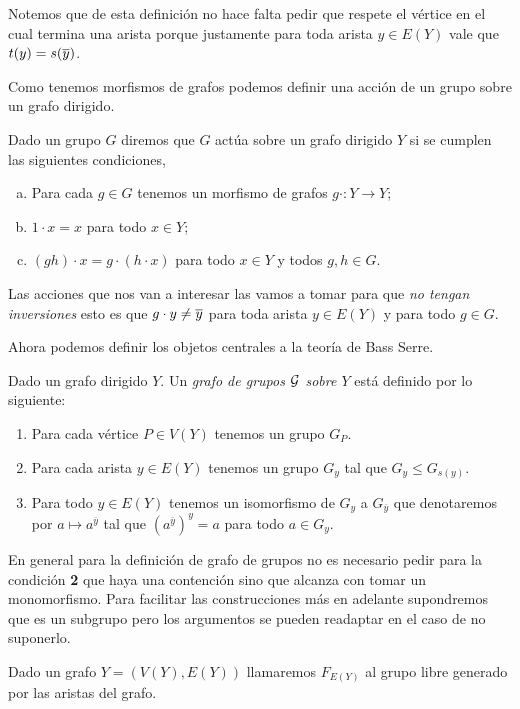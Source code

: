 \documentclass[tesis.tex]{subfiles}
\begin{document}
Notemos que de esta definición no hace falta pedir que respete el vértice en el cual termina una arista porque justamente para toda arista $y \in E(Y)$ vale que $t(y) = s(\overline y)$.

Como tenemos morfismos de grafos podemos definir una acción de un grupo sobre un grafo dirigido.

\begin{deff}
	Dado un grupo $G$ diremos que $G$ actúa sobre un grafo dirigido $Y$ si se cumplen las siguientes condiciones,
	\begin{enumerate}[a.]
		\item Para cada $g \in G$ tenemos un morfismo de grafos $g \cdot : Y \to Y$;
		\item $1 \cdot x = x$ para todo $x \in Y$;
		\item $(gh) \cdot x = g \cdot (h \cdot x)$ para todo $x \in Y$ y todos $g,h \in G$.
	\end{enumerate}
\end{deff}

Las acciones que nos van a interesar las vamos a tomar para que \emph{no tengan inversiones} esto es que $g \cdot y \neq \overline y$ para toda arista $y \in E(Y)$ y para todo $g \in G$.

Ahora podemos definir los objetos centrales a la teoría de Bass Serre.
	

\begin{deff}
	Dado un grafo dirigido $Y$.
	Un \emph{grafo de grupos $\cal G$ sobre $Y$} está definido por lo siguiente:
	\begin{enumerate}
		\item Para cada vértice $P \in V(Y)$ tenemos un grupo $G_P$.
		\item  Para cada arista $y \in E(Y)$ tenemos un grupo $G_y$ tal que $G_y \le G_{s(y)}$.
		\item Para todo $y \in E(Y)$ tenemos un isomorfismo de $G_y$ a $G_{\overline y}$ que denotaremos por $a \mapsto a^{\overline y} $ tal que $(a^{\overline y})^y  = a$ para todo $a \in G_y$.
	\end{enumerate}
\end{deff}

En general para la definición de grafo de grupos no es necesario pedir para la condición \textbf{2} que haya una contención sino que alcanza con tomar un monomorfismo. 
Para facilitar las construcciones más en adelante supondremos que es un subgrupo pero los argumentos se pueden readaptar en el caso de no suponerlo.


Dado un grafo $Y = (V(Y), E(Y))$ llamaremos $F_{E(Y)}$ al grupo libre  generado por las aristas del grafo.
\end{document}
